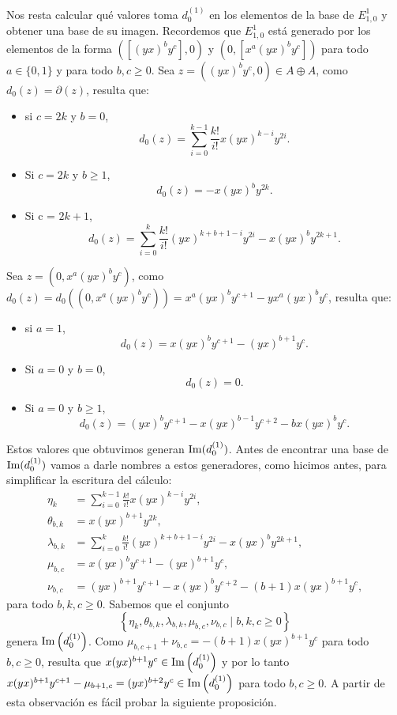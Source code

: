 \documentclass[fleqn,../tesis.tex]{subfiles}
\begin{document}
Nos resta calcular qué valores toma $d_{0}^{(1)}$ en los elementos de la base de $E_{1, 0}^1$ y obtener una base de su imagen.
Recordemos que $E_{1, 0}^1$ está generado por los elementos de la forma $\left(\left[(yx)^by^c\right], 0\right)$ y $\left(0, \left[x^a(yx)^by^c\right]\right)$
para todo $a \in \{0, 1\}$ y para todo $b, c \geq 0$. Sea $z = ((yx)^by^c, 0) \in A\oplus A$, como $d_0(z) = \partial(z)$, resulta que:
\begin{itemize}
    \item si $c = 2k$ y $b = 0$,
         \[d_0(z) = \sum_{i = 0}^{k - 1}\frac{k!}{i!}x(yx)^{k - i}y^{2i}.\]
    \item Si $c = 2k$ y  $b \geq 1$,
         \[d_0(z) = -x(yx)^by^{2k}.\]
    \item Si c = $2k + 1$,
        \[d_0(z) = \sum_{i = 0}^k\frac{k!}{i!}(yx)^{k + b + 1 - i}y^{2i} - x(yx)^by^{2k + 1}.\]
\end{itemize}
Sea $z = (0, x^a(yx)^by^c)$, como $d_0(z) = d_0((0, x^a(yx)^by^c)) = x^a(yx)^by^{c + 1} - yx^a(yx)^{b}y^c$, resulta que:
\begin{itemize}
    \item si $a = 1$,
        \[
            d_0(z) = x(yx)^by^{c + 1} - (yx)^{b + 1}y^c.        
        \]
    \item Si $a = 0$ y $b = 0$,
        \[
            d_0(z) = 0.        
        \]
    \item Si $a = 0$ y $b \geq 1$,
        \[
            d_0(z) = (yx)^{b}y^{c + 1} - x(yx)^{b - 1}y^{c + 2} - bx(yx)^{b}y^c.
        \]
\end{itemize}
Estos valores que obtuvimos generan $\operatorname{Im}(d_0^{(1)})$. Antes de encontrar una base de $\operatorname{Im}(d_0^{(1)})$ vamos a darle nombres
a estos generadores, como hicimos antes, para simplificar la escritura del cálculo:
\begin{align*}
    \eta_k &= \sum_{i = 0}^{k - 1}\frac{k!}{i!}x(yx)^{k - i}y^{2i},\\
    \theta_{b, k} &= x(yx)^{b + 1}y^{2k},\\
    \lambda_{b, k} &= \sum_{i = 0}^k \frac{k!}{i!}(yx)^{k + b + 1 - i}y^{2i} - x(yx)^by^{2k + 1},\\
    \mu_{b, c} &= x(yx)^by^{c + 1} - (yx)^{b + 1}y^c,\\
    \nu_{b, c} &= (yx)^{b + 1}y^{c + 1} - x(yx)^{b}y^{c + 2} -(b + 1)x(yx)^{b + 1}y^c,
\end{align*}
para todo $b, k, c \geq 0$. Sabemos que el conjunto
\[
   \left\lbrace \eta_k, \theta_{b, k}, \lambda_{b, k}, \mu_{b, c}, \nu_{b, c} \mid b, k, c \geq 0 \right\rbrace
\]
genera $\operatorname{Im}\left(d_0^{(1)}\right)$.
Como $\mu_{b, c + 1} + \nu_{b, c} = -(b + 1)x (yx)^{b + 1}y^c$ para todo $b, c \geq 0$,
resulta que $x(yx)^{b + 1}y^c \in \operatorname{Im}\left(d_0^{(1)}\right)$ y por lo tanto
$x(yx)^{b + 1}y^{c + 1} - \mu_{b + 1, c} = (yx)^{b + 2}y^c \in \operatorname{Im}\left(d_0^{(1)}\right)$ para todo $b, c \geq 0$.
A partir de esta observación es fácil probar la siguiente proposición.
\end{document}
